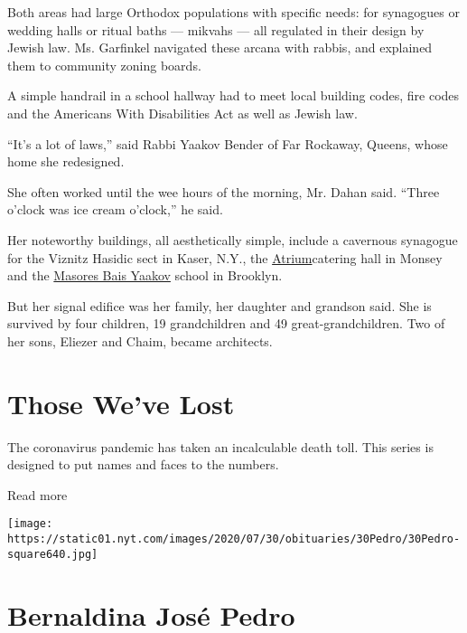 Both areas had large Orthodox populations with specific needs: for
synagogues or wedding halls or ritual baths --- mikvahs --- all
regulated in their design by Jewish law. Ms. Garfinkel navigated these
arcana with rabbis, and explained them to community zoning boards.

A simple handrail in a school hallway had to meet local building codes,
fire codes and the Americans With Disabilities Act as well as Jewish
law.

``It's a lot of laws,'' said Rabbi Yaakov Bender of Far Rockaway,
Queens, whose home she redesigned.

She often worked until the wee hours of the morning, Mr. Dahan said.
``Three o'clock was ice cream o'clock,'' he said.

Her noteworthy buildings, all aesthetically simple, include a cavernous
synagogue for the Viznitz Hasidic sect in Kaser, N.Y., the
\href{https://www.theyeshivaworld.com/news/featured/1838568/alert-from-rockland-health-dept-atrium-wedding-hall-among-locations-exposed-to-coronavirus.html}{Atrium}catering
hall in Monsey and the
\href{https://insideschools.org/school/22KAHA}{Masores Bais Yaakov}
school in Brooklyn.

But her signal edifice was her family, her daughter and grandson said.
She is survived by four children, 19 grandchildren and 49
great-grandchildren. Two of her sons, Eliezer and Chaim, became
architects.

\href{https://www.nytimes.com/interactive/2020/obituaries/people-died-coronavirus-obituaries.html?action=click\&pgtype=Article\&state=default\&region=BELOW_MAIN_CONTENT\&context=covid_obits_promo}{}

\hypertarget{those-weve-lost}{%
\section{Those We've Lost}\label{those-weve-lost}}

The coronavirus pandemic has taken an incalculable death toll. This
series is designed to put names and faces to the numbers.

Read more

\texttt{[image: https://static01.nyt.com/images/2020/07/30/obituaries/30Pedro/30Pedro-square640.jpg]}

\hypertarget{bernaldina-josuxe9-pedro}{%
\section{Bernaldina José Pedro}\label{bernaldina-josuxe9-pedro}}

